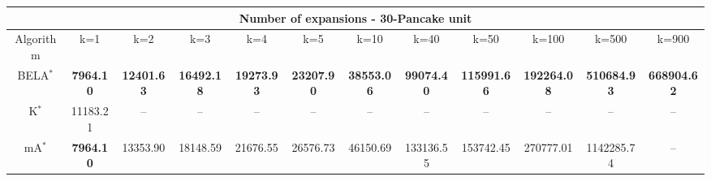 \begin{tabular}{c|ccccccccccc}\toprule
\multicolumn{12}{c}{Number of expansions - 30-Pancake unit}\\ \midrule
Algorithm & k=1 & k=2 & k=3 & k=4 & k=5 & k=10 & k=40 & k=50 & k=100 & k=500 & k=900 \\ \midrule
BELA$^*$ & \textbf{7964.10} & \textbf{12401.63} & \textbf{16492.18} & \textbf{19273.93} & \textbf{23207.90} & \textbf{38553.06} & \textbf{99074.40} & \textbf{115991.66} & \textbf{192264.08} & \textbf{510684.93} & \textbf{668904.62} \\
K$^*$ & 11183.21 & -- & -- & -- & -- & -- & -- & -- & -- & -- & -- \\
mA$^*$ & \textbf{7964.10} & 13353.90 & 18148.59 & 21676.55 & 26576.73 & 46150.69 & 133136.55 & 153742.45 & 270777.01 & 1142285.74 & -- \\ \bottomrule 
\end{tabular}

